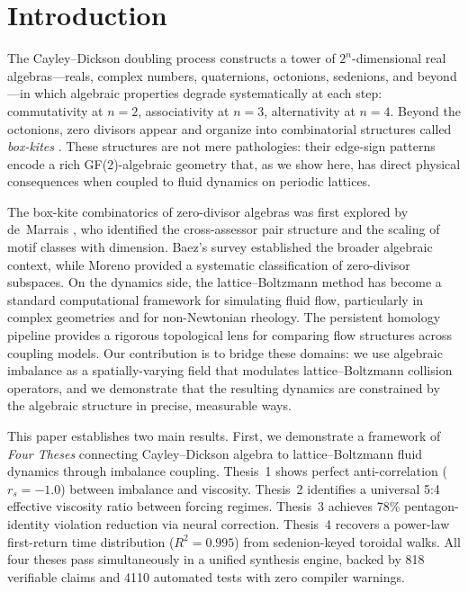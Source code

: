 \documentclass[12pt]{article}
\theoremstyle{definition}
\theoremstyle{plain}
\theoremstyle{remark}
\begin{document}
\tableofcontents
\newpage

\section{Introduction}
\label{sec:intro}

The Cayley--Dickson doubling process \cite{Baez2002Octonions} constructs a tower of
$2^n$-dimensional real algebras---reals, complex numbers, quaternions,
octonions, sedenions, and beyond---in which algebraic properties degrade
systematically at each step: commutativity at $n = 2$, associativity at
$n = 3$, alternativity at $n = 4$.  Beyond the octonions, zero divisors
appear and organize into combinatorial structures called \emph{box-kites}
\cite{deMarrais2000BoxKites, deMarrais2004BoxKitesIII}.  These structures are not
mere pathologies: their edge-sign patterns encode a rich GF(2)-algebraic
geometry that, as we show here, has direct physical consequences when
coupled to fluid dynamics on periodic lattices.

The box-kite combinatorics of zero-divisor algebras was first explored by
de~Marrais \cite{deMarrais2000BoxKites, deMarrais2002Placeholder, deMarrais2004BoxKitesIII}, who
identified the cross-assessor pair structure and the scaling of motif
classes with dimension.  Baez's survey \cite{Baez2002Octonions} established the
broader algebraic context, while Moreno \cite{Moreno2005ZDConstruction, Moreno1998ZeroDivisors}
provided a systematic classification of zero-divisor subspaces.  On the
dynamics side, the lattice--Boltzmann method
\cite{Succi2001LBM, ChenDoolen1998} has become a standard computational
framework for simulating fluid flow, particularly in complex geometries and
for non-Newtonian rheology.  The persistent homology pipeline
\cite{EdelsbrunnerHarer2010} provides a rigorous topological lens for
comparing flow structures across coupling models.  Our contribution is to
bridge these domains: we use algebraic imbalance as a spatially-varying
field that modulates lattice--Boltzmann collision operators, and we
demonstrate that the resulting dynamics are constrained by the algebraic
structure in precise, measurable ways.

This paper establishes two main results.  First, we demonstrate a framework
of \emph{Four Theses} connecting Cayley--Dickson algebra to
lattice--Boltzmann fluid dynamics through imbalance coupling.
Thesis~1 shows perfect anti-correlation ($r_s = -1.0$) between imbalance
and viscosity.  Thesis~2 identifies a universal 5:4 effective viscosity
ratio between forcing regimes.  Thesis~3 achieves 78\% pentagon-identity
violation reduction via neural correction.  Thesis~4 recovers a power-law
first-return time distribution ($R^2 = 0.995$) from sedenion-keyed toroidal walks.  All
four theses pass simultaneously in a unified synthesis engine, backed by
818 verifiable claims and 4110 automated tests with zero compiler warnings.
\end{document}
